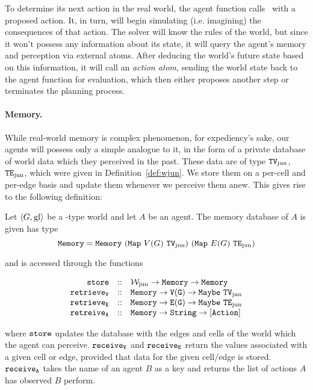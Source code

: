 To determine its next action in the real world, the agent function calls \dlvhex\ with a proposed action. It, in turn, will begin simulating (i.e. imagining) the consequences of that action. The solver will know the rules of the world, but since it won't possess any information about its state, it will query the agent's memory and perception via external atoms. After deducing the world's future state based on this information, it will call an {\em action atom}, sending the world state back to the agent function for evaluation, which then either proposes another step or terminates the planning process.

\paragraph{Memory.} While real-world memory is complex phenomenon, for expediency's sake, our agents will possess only a simple analogue to it, in the form of a private database of world data which they perceived in the past. These data are of type $\mathtt{TV_{\mathrm{jun}}}$, $\mathtt{TE_{\mathrm{jun}}}$, which were given in Definition~\ref{def:wjun}. We store them on a per-cell and per-edge basis and update them whenever we perceive them anew. This gives rise to the following definition:


\begin{definition}
	Let $\langle G,\mathrm{gl} \rangle$ be a \wjun-type world and let $A$ be an agent. The memory database of $A$ is given has type
	$$
		\type{Memory} = \field{Memory}\ \type{(Map\ \mathnormal{V(G)}\ TV_{\mathrm{jun}})\ (Map\ \mathnormal{E(G)}\ TE_{\mathrm{jun}})}
	$$
	
	and is accessed through the functions
	
	$$
		\begin{array}{r c l}
			\mathtt{store} & :: & \mathtt{\mathcal{W}_{\mathrm{jun}} \rightarrow Memory \rightarrow Memory}\\
			\mathtt{retrieve_V} & :: & \mathtt{Memory \rightarrow V(G) \rightarrow Maybe\ TV_{\mathrm{jun}}}\\
			\mathtt{retrieve_E} & :: & \mathtt{Memory \rightarrow E(G) \rightarrow Maybe\ TE_{\mathrm{jun}}}\\
			\mathtt{retreive_A} & :: & \mathtt{Memory \rightarrow String \rightarrow [Action]}
		\end{array}
	$$
	
	where $\mathtt{store}$ updates the database with the edges and cells of the world which the agent can perceive. $\mathtt{receive_V}$ and $\mathtt{receive_E}$ return the values associated with a given cell or edge, provided that data for the given cell/edge is stored. $\mathtt{receive_A}$ takes the name of an agent $B$ as a key and returns the list of actions $A$ has observed $B$ perform.
\end{definition}

